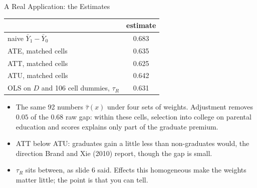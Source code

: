 \documentclass[aspectratio=169,11pt,xcolor=dvipsnames]{beamer}
\newcommand{\core}{\,\raisebox{0.6pt}{\textcolor{corestar}{$\bigstar$}}}
\begin{document}
\begin{frame}{A Real Application: the Estimates\core}
\begin{center}\small
\renewcommand{\arraystretch}{1.15}
\begin{tabular}{lc}
\toprule
 & estimate \\
\midrule
naive $\bar Y_1 - \bar Y_0$ & 0.683 \\
ATE, matched cells & 0.635 \\
ATT, matched cells & 0.625 \\
ATU, matched cells & 0.642 \\
OLS on $D$ and 106 cell dummies, $\tau_R$ & 0.631 \\
\bottomrule
\end{tabular}
\end{center}
\begin{itemize}\itemsep2pt
  \item The same 92 numbers $\hat\tau(x)$ under four sets of weights. Adjustment
        removes $0.05$ of the $0.68$ raw gap: within these cells, selection into
        college on parental education and scores explains only part of the
        graduate premium.
  \item ATT below ATU: graduates gain a little less than non-graduates would,
        the direction Brand and Xie (2010) report, though the gap is small.
  \item $\tau_R$ sits between, as slide 6 said. Effects this homogeneous make
        the weights matter little; the point is that you can tell.
\end{itemize}
\end{frame}
\end{document}
